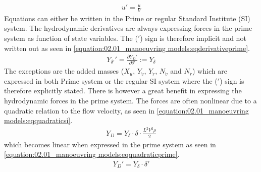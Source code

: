 \begin{equation}\label{equation:02.01_manoeuvring models:eqprime}
\begin{split}\displaystyle u'=\frac{u}{V}\end{split}
\end{equation}
\sphinxAtStartPar
Equations can either be written in the Prime or regular Standard Institute (SI) system. The hydrodynamic derivatives are always expressing forces in the prime system as function of state variables. The (\('\)) sign is therefore implicit and not written out as seen in \autoref{equation:02.01_manoeuvring models:eqderivativeprime}.
\begin{equation}\label{equation:02.01_manoeuvring models:eqderivativeprime}
\begin{split}\displaystyle Y_{\delta'}'=\frac{\partial Y_D'}{\partial \delta'} := Y_{\delta} \end{split}
\end{equation}
\sphinxAtStartPar
The exceptions are the added masses (\(X_{\dot{u}}\), \(Y_{\dot{v}}\), \(Y_{\dot{r}}\), \(N_{\dot{v}}\) and \(N_{\dot{r}}\)) which are expressed in both Prime system or the regular SI system where the (\('\)) sign is therefore
explicitly stated.
There is however a great benefit in expressing the hydrodynamic forces in the prime system. The forces are often nonlinear due to a quadratic relation to the flow velocity, as seen in \autoref{equation:02.01_manoeuvring models:eqquadraticsi}.
\begin{equation}\label{equation:02.01_manoeuvring models:eqquadraticsi}
\begin{split}\displaystyle Y_{D}=Y_{\delta} \cdot \delta \cdot \frac{L^2V^2\rho}{2}\end{split}
\end{equation}
which becomes linear when expressed in the prime system as seen in \autoref{equation:02.01_manoeuvring models:eqquadraticprime}.
\begin{equation}\label{equation:02.01_manoeuvring models:eqquadraticprime}
\begin{split}\displaystyle Y_{D}'=Y_{\delta} \cdot \delta'\end{split}
\end{equation}


